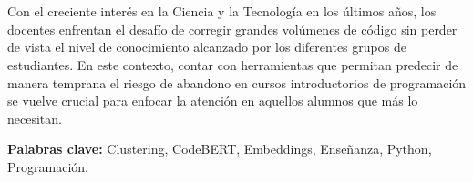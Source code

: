 \chapter*{\runtitulo}

\noindent Con el creciente interés en la Ciencia y la Tecnología en los últimos años, los docentes enfrentan el desafío de corregir grandes volúmenes de código sin perder de vista el nivel de conocimiento alcanzado por los diferentes grupos de estudiantes. En este contexto, contar con herramientas que permitan predecir de manera temprana el riesgo de abandono en cursos introductorios de programación se vuelve crucial para enfocar la atención en aquellos alumnos que más lo necesitan.

\bigskip

\noindent\textbf{Palabras clave:} Clustering, CodeBERT, Embeddings, Enseñanza, Python, Programación.